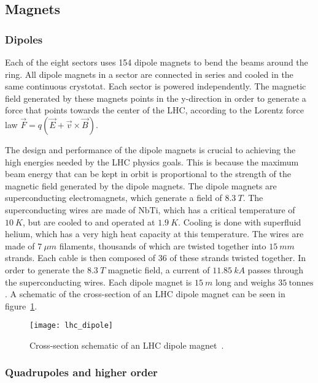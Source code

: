 \subsection{Magnets}\label{subsec:lhc_magnets}

\subsubsection{Dipoles}
Each of the eight sectors uses 154 dipole magnets to bend the beams around the ring.
All dipole magnets in a sector are connected in series and cooled in the same continuous crystotat.
Each sector is powered independently.
The magnetic field generated by these magnets points in the y-direction
in order to generate a force that points towards the center of the LHC,
according to the Lorentz force law $\vec{F} = q\left(\vec{E}+\vec{v}\times\vec{B}\right)$.

The design and performance of the dipole magnets is crucial to achieving the high energies needed by the LHC physics goals.
This is because the maximum beam energy that can be kept in orbit is proportional to the strength of the magnetic field generated by the dipole magnets.
The dipole magnets are superconducting electromagnets, which generate a field of $8.3~T$.
The superconducting wires are made of $\mathrm{NbTi}$, which has a critical temperature of $10~K$,
but are cooled to and operated at $1.9~K$.
Cooling is done with superfluid helium, which has a very high heat capacity at this temperature.
The wires are made of $7~\mu m$ filaments, thousands of which are twisted together into $15~mm$ strands.
Each cable is then composed of 36 of these strands twisted together.
In order to generate the $8.3~T$ magnetic field, a current of $11.85~kA$ passes through the superconducting wires.
Each dipole magnet is $15~m$ long and weighs $35~\text{tonnes}$.
A schematic of the cross-section of an LHC dipole magnet can be seen in figure~\ref{fig:lhc_dipole}.

\begin{figure}[!ht]\centering
\texttt{[image: lhc\_dipole]}
\caption{Cross-section schematic of an LHC dipole magnet~\cite{lhc-dipole}.}
\label{fig:lhc_dipole}
\end{figure}

\subsubsection{Quadrupoles and higher order}

